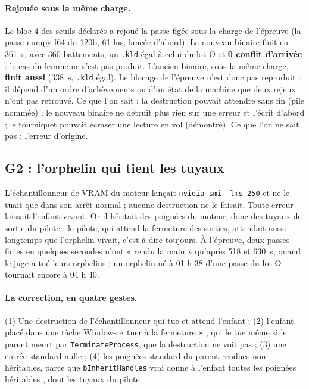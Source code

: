 \paragraph{Rejouée sous la même charge.} Le bloc 4 des seuils déclarés a rejoué la passe figée sous la charge de l'épreuve (la passe numpy f64 du 120b, \SI{61}{\Go} lus, lancée d'abord). Le nouveau binaire finit en \SI{361}{\second}, avec 360 battements, un \texttt{.kld} égal à celui du lot O et \textbf{0 conflit d'arrivée} : le cas du lemme ne s'est pas produit. L'ancien binaire, sous la même charge, \textbf{finit aussi} (\SI{338}{\second}, \texttt{.kld} égal). Le blocage de l'épreuve n'est donc pas reproduit : il dépend d'un ordre d'achèvements ou d'un état de la machine que deux rejeux n'ont pas retrouvé. Ce que l'on sait : la destruction pouvait attendre sans fin (pile nommée) ; le nouveau binaire ne détruit plus rien sur une erreur et l'écrit d'abord ; le tourniquet pouvait écraser une lecture en vol (démontré). Ce que l'on ne sait pas : l'erreur d'origine.

\subsection{G2 : l'orphelin qui tient les tuyaux}\label{t2e-sec:g2}

L'échantillonneur de VRAM du moteur lançait \texttt{nvidia-smi -lms 250} et ne le tuait que dans son arrêt normal ; aucune destruction ne le faisait. Toute erreur laissait l'enfant vivant. Or il héritait des poignées du moteur, donc des tuyaux de sortie du pilote : le pilote, qui attend la fermeture des sorties, attendait aussi longtemps que l'orphelin vivait, c'est-à-dire toujours. À l'épreuve, deux passes finies en quelques secondes n'ont « rendu la main » qu'après 518 et \SI{630}{\second}, quand le juge a tué leurs orphelins ; un orphelin né à 01 h 38 d'une passe du lot O tournait encore à 04 h 40.

\paragraph{La correction, en quatre gestes.} (1) Une destruction de l'échantillonneur qui tue et attend l'enfant ; (2) l'enfant placé dans une tâche Windows « tuer à la fermeture » \cite{ms-jobobject-limit}, qui le tue même si le parent meurt par \texttt{TerminateProcess}, que la destruction ne voit pas ; (3) une entrée standard nulle ; (4) les poignées standard du parent rendues non héritables, parce que \texttt{bInheritHandles} vrai donne à l'enfant toutes les poignées héritables \cite{ms-createprocess}, dont les tuyaux du pilote.

